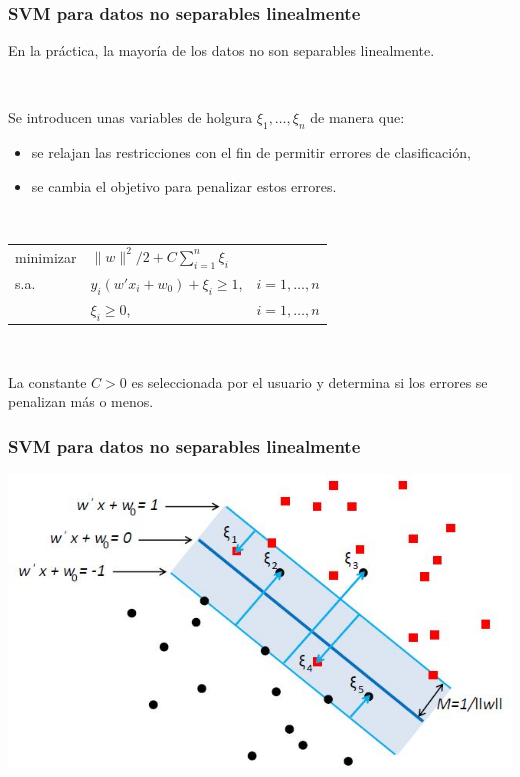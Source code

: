 \documentclass[dvipsnames, pdflatex,slidecentered]{beamer}
\begin{document}
\begin{frame}[plain]
\frametitle{SVM para datos no separables linealmente}

En la práctica, la mayoría de los datos no son separables linealmente.

\

Se introducen unas variables de holgura $\xi_1,\ldots,\xi_n$ de manera que:

\begin{itemize}
\item se relajan las restricciones con el fin de permitir errores de clasificación,
\item se cambia el objetivo para penalizar estos errores.
\end{itemize}

\

\begin{center}
\begin{tabular}{lll}
minimizar & $\|w\|^2 / 2 + C\sum_{i=1}^n \xi_i$ \\
s.a. & $y_i(w' x_i + w_0) + \xi_i\geq 1$,  &  $i=1,\ldots,n$\\
& $\xi_i\geq 0$,  &  $i=1,\ldots,n$
\end{tabular}
\end{center}

\

La constante $C>0$ es seleccionada por el usuario y determina si los errores se penalizan más o menos.

\end{frame}
\begin{frame}[plain]
\frametitle{SVM para datos no separables linealmente}

\begin{center}
\includegraphics[scale=0.7]{holgura.jpg}
\end{center}


\end{frame}
\end{document}
